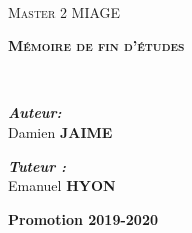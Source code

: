\begin{titlepage}
\begin{center}

\setlength{\parindent}{0pt}

~\\[1cm]


\textsc{\Huge Master 2 MIAGE}\\[0.5cm]

\vspace{5mm}

\textsc{\huge \bfseries  Mémoire de fin d'études}\\[1.5cm]



\HRule

{\huge \bfseries \thetitle \\[0.4cm] }


\HRule

\vspace{5mm}

\begin{minipage}{0.4\textwidth}
\begin{flushleft} \large
\emph{\textbf{Auteur:}}\\
Damien \textsc{\textbf{JAIME}}
\end{flushleft}
\end{minipage}
\begin{minipage}{0.4\textwidth}
\begin{flushright} \large
\emph{\textbf{Tuteur :}} \\
Emanuel \textsc{\textbf{HYON}}
\end{flushright}
\end{minipage}

\vfill

{\huge \bfseries Promotion 2019-2020}

\end{center}
\end{titlepage}